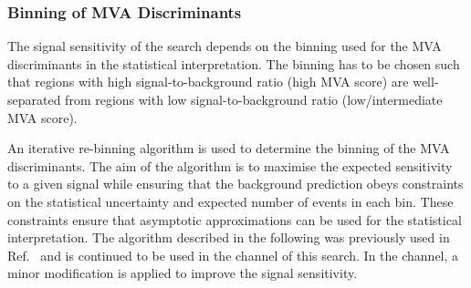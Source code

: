 \subsubsection{Binning of MVA Discriminants}%
\label{sec:binning_alg}

The signal sensitivity of the search depends on the binning used for the MVA
discriminants in the statistical interpretation. The binning has to be chosen
such that regions with high signal-to-background ratio (high MVA score) are
well-separated from regions with low signal-to-background ratio
(low/intermediate MVA score).

An iterative re-binning algorithm is used to determine the binning of the MVA
discriminants. The aim of the algorithm is to maximise the expected sensitivity
to a given signal while ensuring that the background prediction obeys
constraints on the statistical uncertainty and expected number of events in each
bin. These constraints ensure that asymptotic approximations can be used for the
statistical interpretation. The algorithm described in the following was
previously used in Ref.~\cite{HIGG-2016-16-witherratum} and is continued to be
used in the \hadhad channel of this search. In the \lephad channel, a minor
modification is applied to improve the signal sensitivity.

